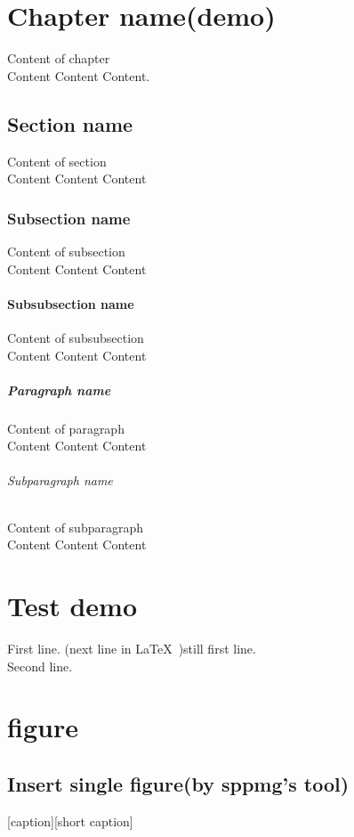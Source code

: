 \documentclass[class=NCNU_thesis, crop=false]{standalone}
\begin{document}
\chapter{Chapter name(demo)}
Content of chapter \\
Content Content Content.

\section{Section name}
Content of section \\
Content Content Content
\subsection{Subsection name}
Content of subsection \\
Content Content Content

\subsubsection{Subsubsection name}
Content of subsubsection \\
Content Content Content

\paragraph{Paragraph name}
Content of paragraph \\
Content Content Content

\subparagraph{Subparagraph name}
Content of subparagraph \\
Content Content Content


\chapter{Test demo}
First line.
(next line in \LaTeX\ )still first line. \\
Second line.


\chapter{figure}
\section{Insert single figure(by sppmg's tool)}
[caption][short caption]
\end{document}
